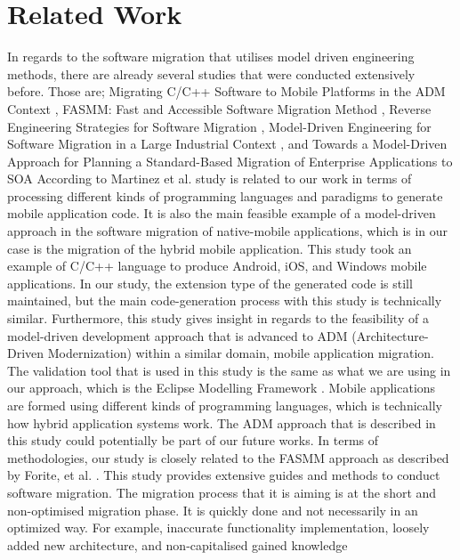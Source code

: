 \documentclass[conference]{IEEEtran}
\begin{document}
\section{Related Work}
In regards to the software migration that utilises model driven engineering methods,
there are already several studies that were conducted extensively before.
Those are; Migrating C/C++ Software to Mobile Platforms in the ADM Context \cite{b6},
FASMM: Fast and Accessible Software Migration Method \cite{b7}, Reverse Engineering
Strategies for Software Migration \cite{b8}, Model-Driven Engineering
for Software Migration in a Large Industrial Context \cite{b9}, and
Towards a Model-Driven Approach for Planning a
Standard-Based Migration of Enterprise Applications to SOA \cite{b10}
\newline
According to Martinez et al.\cite{b6} study is related to our work in terms of processing different kinds of
programming languages and paradigms to generate mobile application code. It is also
the main feasible example of a model-driven approach in the software migration of native-mobile applications,
which is in our case is the migration of the hybrid mobile application.
This study took an example of C/C++ language to produce Android, iOS, and Windows mobile applications.
In our study, the extension type of the generated code is still maintained, but the main code-generation process with this study
is technically similar.
\newline
Furthermore, this study gives insight in regards to the feasibility of a model-driven development approach that is
advanced to ADM (Architecture-Driven Modernization) within a similar domain, mobile application migration.
The validation tool that is used in this study is the same as what we are using in our approach, which is the Eclipse Modelling Framework \cite{b2}.
Mobile applications are formed using different kinds of programming languages, which is technically
how hybrid application systems work.
The ADM approach that is described in this study could potentially be part of our future works.
\newline
In terms of methodologies, our study is closely related to the FASMM approach as described by Forite, et al. \cite{b3} .
This study provides extensive guides and methods to conduct software migration. The migration
process that it is aiming is at the short and non-optimised migration phase.
It is quickly done and not necessarily in an optimized way. For example,
inaccurate functionality implementation, loosely added new architecture, and non-capitalised gained knowledge
\end{document}
